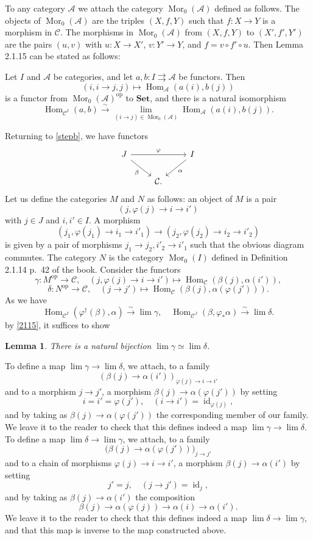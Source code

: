 \documentclass[12pt]{article}
\newtheorem{lem}[thm]{Lemma}
\theoremstyle{remark}
\theoremstyle{definition}
\newcommand{\n}{\noindent}
\newcommand{\A}{\mathcal A}
\newcommand{\C}{\mathcal C}
\newcommand{\Set}{\textbf{Set}}
\newcommand{\p}{\varphi}
\newcommand{\pa}{\rightrightarrows}
\newcommand{\xr}{\xrightarrow}
\newcommand{\be}{\begin{equation}}
\newcommand{\ee}{\end{equation}}
\DeclareMathOperator{\id}{id}
\DeclareMathOperator{\h}{Hom}
\DeclareMathOperator{\Mor}{Mor}
\DeclareMathOperator{\op}{op}
\begin{document}
To any category $\A$ we attach the category $\Mor_0(\A)$ defined as follows. The objects of $\Mor_0(\A)$ are the triples $(X,f,Y)$ such that $f:X\to Y$ is a morphism in $\C$. The morphisms in $\Mor_0(\A)$ from $(X,f,Y)$ to $(X',f',Y')$ are the pairs $(u,v)$ with $u:X\to X'$, $v:Y'\to Y$, and $f=v\circ f'\circ u$. Then Lemma 2.1.15 can be stated as follows: 

Let $I$ and $\A$ be categories, and let $a,b:I\pa\A$ be functors. Then 
$$
(i,i\to j,j)\mapsto\h_\A(a(i),b(j))
$$ 
is a functor from $\Mor_0(\A)^{\op}$ to $\Set$, and there is a natural isomorphism 
% 
\be\label{2115} 
\h_{\C^I}(a,b)\xr\sim\lim_{(i\to j)\in\Mor_0(\A)}\h_\A(a(i),b(j)).
\ee
% 

Returning to \eqref{stepb}, we have functors 
$$
\begin{tikzcd}
J\ar{rr}{\p}\ar{dr}[swap]{\beta}&&I\ar{dl}{\alpha}\\ 
&\C.
\end{tikzcd}
$$ 
Let us define the categories $M$ and $N$ as follows: an object of $M$ is a pair 
$$
(j,\p(j)\to i\to i')
$$ 
with $j\in J$ and $i,i'\in I$. A morphism 
$$
(j_1,\p(j_1)\to i_1\to i'_1)\to(j_2,\p(j_2)\to i_2\to i'_2)
$$ 
is given by a pair of morphisms $j_1\to j_2,i'_2\to i'_1$ such that the obvious diagram commutes. The category $N$ is the category $\Mor_0(I)$ defined in Definition 2.1.14 p.~42 of the book. Consider the functors 
$$
\gamma:M^{\op}\to\C,\quad(j,\p(j)\to i\to i')\mapsto\h_\C(\beta(j),\alpha(i')), 
$$ 
$$
\delta:N^{\op}\to\C,\quad(j\to j')\mapsto\h_\C(\beta(j),\alpha(\p(j'))). 
$$ 
As we have 
$$
\h_{\C^I}(\p^\dagger(\beta),\alpha)\xr\sim\lim\gamma,\quad
\h_{\C^J}(\beta,\p_*\alpha)\xr\sim\lim\delta. 
$$ 
by \eqref{2115}, it suffices to show 
%
\begin{lem} 
%
There is a natural bijection $\lim\gamma\simeq\lim\delta$. 
%
\end{lem} 
%
\n{\em Proof.} To define a map $\lim\gamma\to\lim\delta$, we attach, to a family 
$$
(\beta(j)\to\alpha(i'))_{\p(j)\to i\to i'}
$$ 
and to a morphism $j\to j'$, a morphism $\beta(j)\to\alpha(\p(j'))$ by setting 
$$
i=i'=\p(j'),\quad(i\to i')=\id_{\p(j)},
$$ 
and by taking as $\beta(j)\to\alpha(\p(j'))$ the corresponding member of our family. We leave it to the reader to check that this defines indeed a map $\lim\gamma\to\lim\delta$. To define a map $\lim\delta\to\lim\gamma$, we attach, to a family 
$$
\big(\beta(j)\to\alpha(\p(j'))\big)_{j\to j'}
$$ 
and to a chain of morphisms $\p(j)\to i\to i'$, a morphism $\beta(j)\to\alpha(i')$ by setting 
$$
j'=j,\quad(j\to j')=\id_{j},
$$ 
and by taking as $\beta(j)\to\alpha(i')$ the composition 
$$
\beta(j)\to\alpha(\p(j))\to\alpha(i)\to\alpha(i'). 
$$ 
We leave it to the reader to check that this defines indeed a map $\lim\delta\to\lim\gamma$, and that this map is inverse to the map constructed above. 
% 
\end{document}

